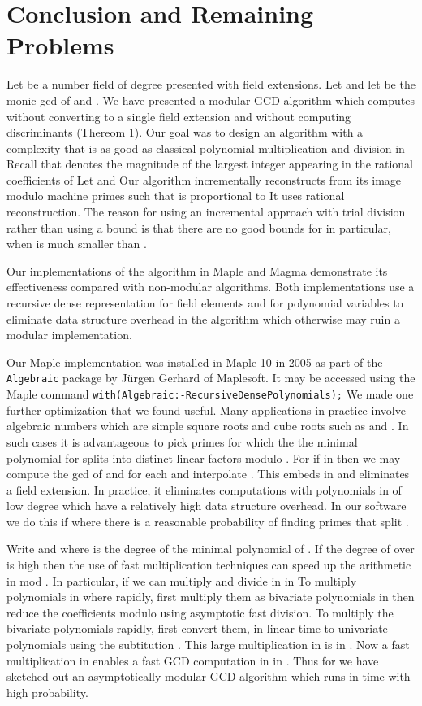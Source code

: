 \documentclass[10pt]{article}
\begin{document}
 
\section{Conclusion and Remaining Problems}
Let  be a number field of degree  presented with  field extensions.
Let  and let  be the monic gcd of  and .
We have presented a modular GCD algorithm which computes  without
converting to a single field extension and without computing discriminants (Thereom 1).
Our goal was to design an algorithm with a complexity
that is as good as classical polynomial multiplication and
division in  Recall that  denotes the magnitude of the
largest integer appearing in the rational coefficients of 
Let  and 
Our algorithm incrementally reconstructs  from its image modulo  machine
primes such that  is proportional to 
It uses rational reconstruction.
The reason for using an incremental approach with trial division
rather than using a bound is that there are no good bounds for 
in particular, when  is much smaller than .

Our implementations of the algorithm in Maple and Magma demonstrate its
effectiveness compared with non-modular algorithms.
Both implementations use a recursive dense representation
for field elements and for polynomial variables to eliminate data
structure overhead in the algorithm which otherwise may
ruin a modular implementation.

Our Maple implementation was installed in Maple 10 in 2005
as part of the {\tt Algebraic} package by J\"urgen Gerhard of Maplesoft.
It may be accessed using the Maple command
{\tt with(Algebraic:-RecursiveDensePolynomials);}
We made one further optimization that we found useful.
Many applications in practice involve algebraic numbers which are
simple square roots and cube roots such as  and .
In such cases it is advantageous to pick primes for which the 
the minimal polynomial  for  splits into distinct 
linear factors modulo .  For if  in 
then we may compute the gcd of  and 
for each  and interpolate .  
This embeds  in  and eliminates a field extension.
In practice, it eliminates computations with polynomials in  of
low degree which have a relatively high data structure overhead.
In our software we do this if  where
there is a reasonable probability of finding primes that split .



Write  and 
where  is the degree of the minimal polynomial of .
If the degree  of  over  is high then the use of fast
multiplication techniques can speed up the arithmetic in  mod .
In particular, if  we can multiply and divide
in  in 
To multiply polynomials in  where 
rapidly, first multiply them as bivariate polynomials in  then reduce
the coefficients modulo  using asymptotic fast division.
To multiply the bivariate polynomials rapidly, first convert them, in linear
time to univariate polynomials using the subtitution .
This large multiplication in  is in .
Now a fast multiplication in  enables a fast GCD computation
in  in .
Thus for  we have sketched out an asymptotically modular GCD
algorithm which runs in  time
with high probability.
\end{document}
